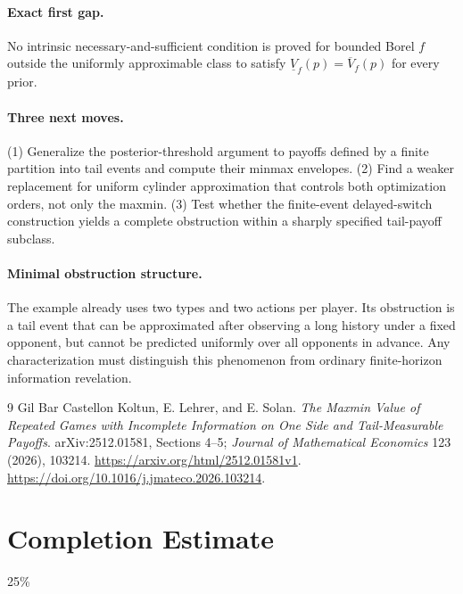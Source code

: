 \documentclass[11pt,a4paper]{article}
\theoremstyle{definition}
\theoremstyle{remark}
\begin{document}
\paragraph{Exact first gap.}
No intrinsic necessary-and-sufficient condition is proved for bounded Borel $f$ outside the uniformly approximable class to satisfy $\underline V_f(p)=\overline V_f(p)$ for every prior.

\paragraph{Three next moves.}
(1) Generalize the posterior-threshold argument to payoffs defined by a finite partition into tail events and compute their minmax envelopes. (2) Find a weaker replacement for uniform cylinder approximation that controls both optimization orders, not only the maxmin. (3) Test whether the finite-event delayed-switch construction yields a complete obstruction within a sharply specified tail-payoff subclass.

\paragraph{Minimal obstruction structure.}
The example already uses two types and two actions per player. Its obstruction is a tail event that can be approximated after observing a long history under a fixed opponent, but cannot be predicted uniformly over all opponents in advance. Any characterization must distinguish this phenomenon from ordinary finite-horizon information revelation.

\begin{thebibliography}{9}
 Gil Bar Castellon Koltun, E. Lehrer, and E. Solan. \emph{The Maxmin Value of Repeated Games with Incomplete Information on One Side and Tail-Measurable Payoffs}. arXiv:2512.01581, Sections 4--5; \emph{Journal of Mathematical Economics} 123 (2026), 103214. \url{https://arxiv.org/html/2512.01581v1}. \url{https://doi.org/10.1016/j.jmateco.2026.103214}.
\end{thebibliography}

\section{Completion Estimate}
25\%
\end{document}

